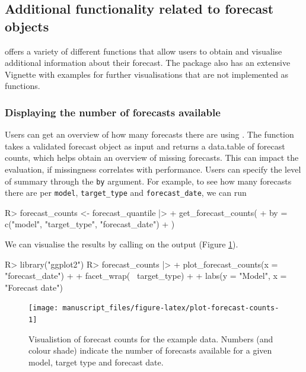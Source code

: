 \documentclass[
]{jss}
\begin{document}
\subsection{Additional functionality related to forecast
objects}\label{additional-functionality-related-to-forecast-objects}

 offers a variety of different functions that allow
users to obtain and visualise additional information about their
forecast. The package also has an extensive Vignette with examples for
further visualisations that are not implemented as functions.

\subsubsection{Displaying the number of forecasts
available}\label{displaying-the-number-of-forecasts-available}

Users can get an overview of how many forecasts there are using
. The function takes a validated forecast
object as input and returns a data.table of forecast counts, which helps
obtain an overview of missing forecasts. This can impact the evaluation,
if missingness correlates with performance. Users can specify the level
of summary through the \texttt{by} argument. For example, to see how
many forecasts there are per \texttt{model}, \texttt{target\_type} and
\texttt{forecast\_date}, we can run

\begin{CodeChunk}
\begin{CodeInput}
R> forecast_counts <- forecast_quantile |>
+   get_forecast_counts(
+     by = c("model", "target_type", "forecast_date")
+   )
\end{CodeInput}
\end{CodeChunk}

We can visualise the results by calling 
on the output (Figure \ref{fig:plot-forecast-counts}).

\begin{CodeChunk}
\begin{CodeInput}
R> library("ggplot2")
R> forecast_counts |>
+   plot_forecast_counts(x = "forecast_date") + 
+   facet_wrap(~ target_type) +
+   labs(y = "Model", x = "Forecast date")
\end{CodeInput}
\begin{figure}[!h]

{\centering \texttt{[image: manuscript\_files/figure-latex/plot-forecast-counts-1]} 

}

\caption[Visualistion of forecast counts for the example data]{Visualistion of forecast counts for the example data. Numbers (and colour shade) indicate the number of forecasts available for a given model, target type and forecast date.}\label{fig:plot-forecast-counts}
\end{figure}
\end{CodeChunk}
\end{document}
